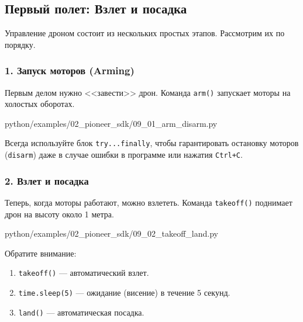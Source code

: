 \subsection{Первый полет: Взлет и посадка}

Управление дроном состоит из нескольких простых этапов. Рассмотрим их по порядку.

\subsubsection*{1. Запуск моторов (Arming)}
Первым делом нужно <<завести>> дрон. Команда \texttt{arm()} запускает моторы на холостых оборотах.

\begin{codefile}[python]{python/examples/02_pioneer_sdk/09_01_arm_disarm.py}
\end{codefile}

\begin{warnbox}[Безопасность]
Всегда используйте блок \texttt{try...finally}, чтобы гарантировать остановку моторов (\texttt{disarm}) даже в случае ошибки в программе или нажатия \texttt{Ctrl+C}.
\end{warnbox}

\subsubsection*{2. Взлет и посадка}
Теперь, когда моторы работают, можно взлететь. Команда \texttt{takeoff()} поднимает дрон на высоту около 1 метра.

\begin{codefile}[python]{python/examples/02_pioneer_sdk/09_02_takeoff_land.py}
\end{codefile}

Обратите внимание:
\begin{enumerate}
    \item \texttt{takeoff()} — автоматический взлет.
    \item \texttt{time.sleep(5)} — ожидание (висение) в течение 5 секунд.
    \item \texttt{land()} — автоматическая посадка.
\end{enumerate}
